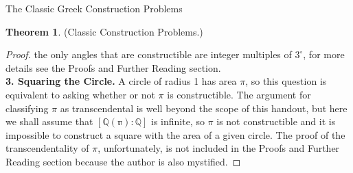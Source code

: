 \documentclass[12pt]{article}
\theoremstyle{definition}
\theoremstyle{definition}
\theoremstyle{definition}
\newtheorem{theorem}{Theorem}[section]
\theoremstyle{definition}
\theoremstyle{definition}
\theoremstyle{definition}
\theoremstyle{definition}
\begin{document}
\begin{section}{The Classic Greek Construction Problems}
\begin{theorem}{(Classic Construction Problems.)}
\begin{proof}
            the only angles that are constructible are integer multiples of \(3^{\circ}\), for more details see the Proofs and Further Reading section.\\
            \break
            \noindent\textbf{3. Squaring the Circle.} A circle of radius 1 has area \(\pi\), so this question is equivalent to asking whether or not \(\pi\) is constructible. The argument for classifying \(\pi\)
            as transcendental is well beyond the scope of this handout, but here we shall assume that \([\mathbb{Q(\pi)} : \mathbb{Q}]\) is infinite, so \(\pi\) is not constructible and it is impossible to construct a 
            square with the area of a given circle. The proof of the transcendentality of \(\pi\), unfortunately, is not included in the Proofs and Further Reading section because the author is also mystified. 
        \end{proof}
    \end{theorem}
\end{section}
\newpage
\end{document}
